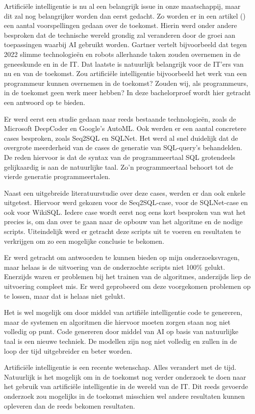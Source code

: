 Artificiële intelligentie is nu al een belangrijk issue in onze maatschappij, maar dit zal nog belangrijker worden dan eerst gedacht. Zo worden er in een artikel (\textcite{Gartner}) een aantal voorspellingen gedaan over de toekomst. Hierin werd onder andere besproken dat de technische wereld grondig zal veranderen door de groei aan toepassingen waarbij AI gebruikt worden. Gartner vertelt bijvoorbeeld dat tegen 2022 slimme technologieën en robots allerhande taken zouden overnemen in de geneeskunde en in de IT. Dat laatste is natuurlijk belangrijk voor de IT'ers van nu en van de toekomst. Zou artificiële intelligentie bijvoorbeeld het werk van een programmeur kunnen overnemen in de toekomst? Zouden wij, als programmeurs, in de toekomst geen werk meer hebben? In deze bachelorproef wordt hier getracht een antwoord op te bieden. 

Er werd eerst een studie gedaan naar reeds bestaande technologieën, zoals de Microsoft DeepCoder en Google's AutoML. Ook werden er een aantal concretere cases besproken, zoals Seq2SQL en SQLNet. Het werd al snel duidelijk dat de overgrote meerderheid van de cases de generatie van SQL-query's behandelden. De reden hiervoor is dat de syntax van de programmeertaal SQL grotendeels gelijkaardig is aan de natuurlijke taal. Zo'n programmeertaal behoort tot de vierde generatie programmeertalen.

Naast een uitgebreide literatuurstudie over deze cases, werden er dan ook enkele uitgetest. Hiervoor werd gekozen voor de Seq2SQL-case, voor de SQLNet-case en ook voor WikiSQL. Iedere case wordt eerst nog eens kort besproken van wat het precies is, om dan over te gaan naar de opbouw van het algoritme en de nodige scripts. Uiteindelijk werd er getracht deze scripts uit te voeren en resultaten te verkrijgen om zo een mogelijke conclusie te bekomen.

Er werd getracht om antwoorden te kunnen bieden op mijn onderzoeksvragen, maar helaas is de uitvoering van de onderzochte scripts niet 100\% gelukt. Enerzijds waren er problemen bij het trainen van de algoritmes, anderzijds liep de uitvoering compleet mis. Er werd geprobeerd om deze voorgekomen problemen op te lossen, maar dat is helaas niet gelukt.

Het is wel mogelijk om door middel van artifiële intelligentie code te genereren, maar de systemen en algoritmen die hiervoor moeten zorgen staan nog niet volledig op punt. Code genereren door middel van AI op basis van natuurlijke taal is een nieuwe techniek. De modellen zijn nog niet volledig en zullen in de loop der tijd uitgebreider en beter worden.

Artificiële intelligentie is een recente wetenschap. Alles verandert met de tijd. Natuurlijk is het mogelijk om in de toekomst nog verder onderzoek te doen naar het gebruik van artificiële intelligentie in de wereld van de IT. Dit reeds gevoerde onderzoek zou mogelijks in de toekomst misschien wel andere resultaten kunnen opleveren dan de reeds bekomen resultaten. 
